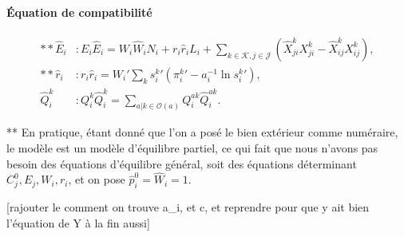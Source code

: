 \paragraph{Équation de compatibilité}
\begin{align}
	** \hat{E}_i & : E_i \hat{E}_i = W_i \hat{W}_i N_i + r_i \hat{r}_i L_i + \sum_{k \in \mathcal{K},j \in \mathcal{J}} \left(\hat{X}_{ji}^k X_{ji}^k - \hat{X}_{ij}^k X_{ij}^k \right), \\
	** \hat{r}_i & : r_i \hat{r}_i = W_i\prime \sum_k {s_i^k}\prime \left( {\pi_i^k}\prime -a_i^{-1} \ln {s_i^k}\prime\right),                                                           \\
	\hat{Q}_i^k  & : Q_i^k \hat{Q}_i^k = \sum_{a|k\in \mathcal{O}(a)} Q_i^{ak} \hat{Q}_i^{ak}.
\end{align}

** En pratique, étant donné que l'on a posé le bien extérieur comme numéraire, le modèle est un modèle d'équilibre partiel, ce qui fait que nous n'avons pas besoin des équations d'équilibre général, soit des équations déterminant $C_j^0, E_j, W_i, r_i$, et on pose $\hat{p}_i^0=\hat{W}_i=1$.


	[rajouter le comment on trouve a_i, et c, et reprendre pour que y ait bien l'équation de Y à la fin aussi]
